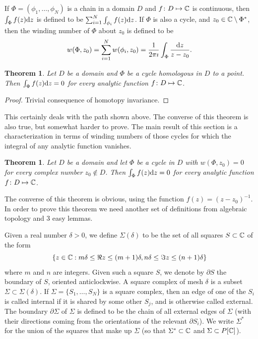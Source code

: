 \documentclass{notes}
\theoremstyle{plain}
\newtheorem{theorem}[proposition]{Theorem}
\begin{document}
If $\Phi = ( \phi_1, \dots, \phi_N )$ is a chain in a domain $D$ and
$f \colon D \mapsto \mathbb{C}$ is continuous, then $\int_\Phi f(z) \mathrm{d} z$ is defined to
be $\sum_{i=1}^N \int_{\phi_i} f(z) \mathrm{d} z$.  If $\Phi$ is also a cycle, and
$z_0 \in \mathbb{C} \setminus \Phi^*$, then the winding number of $\Phi$ about $z_0$
is defined to be
\[
w(\Phi,z_0) = \sum_{i=1}^N w(\phi_i,z_0) = \frac{1}{2 \pi \imath} \int_\Phi
\frac{\mathrm{d} z}{z-z_0}.
\]

\begin{theorem}
Let $D$ be a domain and $\Phi$ be a cycle homologous in $D$ to a point.  Then
$\int_\Phi f(z) \mathrm{d} z = 0$ for every analytic function $f \colon D \mapsto \mathbb{C}$.
\end{theorem}
 
\begin{proof}
Trivial consequence of homotopy invariance.
\end{proof}

This certainly deals with the path shown above.  The converse of this theorem
is also true, but somewhat harder to prove.  The main result of this
section is a characterization in terms of winding numbers of those cycles
for which the integral of any analytic function vanishes.

\begin{theorem}
Let $D$ be a domain and let $\Phi$ be a cycle in $D$ with $w(\Phi,z_0) =
0$ for every complex number $z_0 \notin D$.  Then $\int_\Phi f(z) \mathrm{d} z = 0$ for
every analytic function $f \colon D \mapsto \mathbb{C}$.
\end{theorem}

The converse of this theorem is obvious, using the function $f(z) = 
(z-z_0)^{-1}$.  In order to prove this theorem we need another set of
definitions from algebraic topology and 3 easy lemmas.

Given a real number $\delta > 0$, we define $\Sigma(\delta)$ to be the set
of all squares $S \subset \mathbb{C}$ of the form
\[
\{ z \in \mathbb{C} : m\delta \le \Re z \le (m+1) \delta, n \delta \le \Im z \le
(n+1) \delta \}
\]
where $m$ and $n$ are integers.  Given such a square $S$, we denote by
$\partial S$ the boundary of $S$, oriented anticlockwise.  A square complex %
 of mesh $\delta$ is a subset
$\Sigma \subset \Sigma(\delta)$.  If $\Sigma = \{ S_1, \dots, S_N \}$ is a
square complex, then an edge of one of the $S_i$ is called internal if it is
shared by some other $S_j$, and is otherwise called external.  The boundary
$\partial \Sigma$ of $\Sigma$ is defined to be the chain of all external
edges of $\Sigma$ (with their directions coming from the orientations of the
relevant $\partial S_i$).  We write $\Sigma^*$ for the union of the squares
that make up $\Sigma$ (so that $\Sigma^* \subset \mathbb{C}$ and $\Sigma \subset
P[\mathbb{C}]$).
\end{document}

